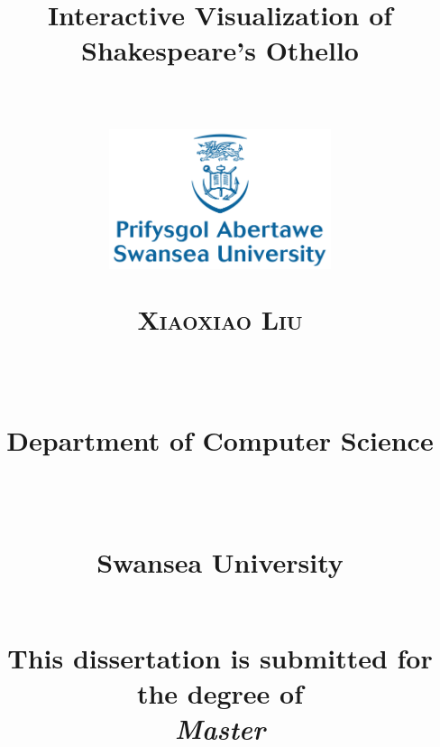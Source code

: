 
\newcommand{\horrule}[1]{\rule{\linewidth}{#1}} %
\title{
\begin{Huge}\textbf{Interactive Visualization of Shakespeare’s Othello} \end{Huge} \\%
\vspace{70px}
\includegraphics[width = 65mm]{Figs/SwanseaUniversity}\\[8ex]
\begin{large} \textsc{\textbf{Xiaoxiao Liu}} \end{large} \\ %
\vspace{10px}
\normalfont \normalsize 
\begin{normalsize}Department of Computer Science \end{normalsize}\\  %
\begin{normalsize} Swansea University \end{normalsize} \\ %
\vspace{60px}
This dissertation is submitted for the degree of\\
\textit{Master}
\vspace{20px}
}
\author{} %
\date{} %

